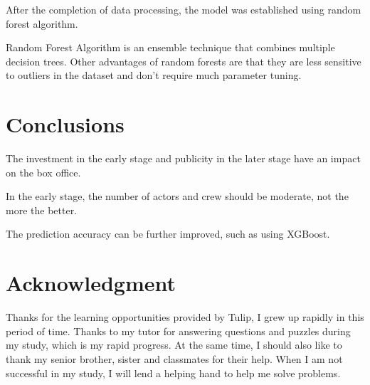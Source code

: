 
After the completion of data processing, the model was established using random forest algorithm.

Random Forest Algorithm is an ensemble technique that combines multiple decision trees. 
    Other advantages of random forests are that they are less sensitive to outliers in the dataset 
    and don’t require much parameter tuning.


\section{Conclusions} \label{sec-conclusions}
The investment in the early stage and publicity in the later stage have an impact on the box office.

In the early stage, the number of actors and crew should be moderate, not the more the better.

The prediction accuracy can be further improved, such as using XGBoost.
\section*{Acknowledgment}

Thanks for the learning opportunities provided by Tulip, 
I grew up rapidly in this period of time. 
Thanks to my tutor for answering questions and puzzles during my study, 
which is my rapid progress. At the same time, I should also like to thank my senior brother, 
sister and classmates for their help. When I am not successful in my study, 
I will lend a helping hand to help me solve problems.